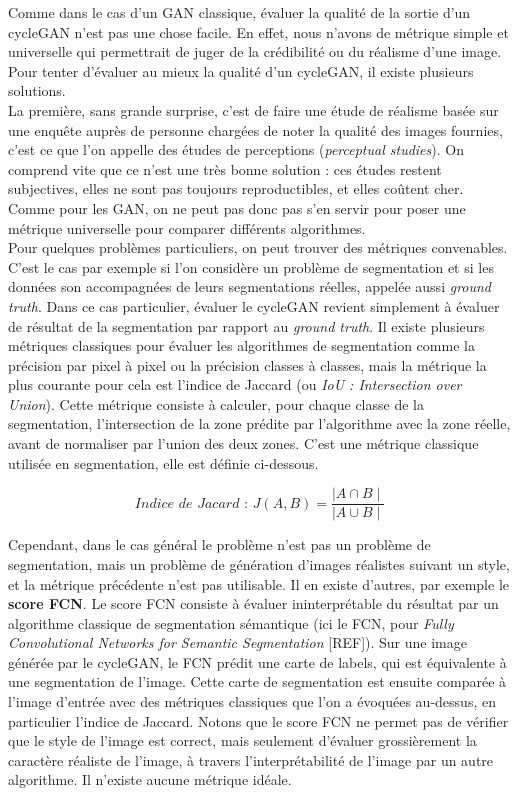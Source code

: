 Comme dans le cas d'un GAN classique, évaluer la qualité de la sortie d'un cycleGAN n'est pas une chose facile. En effet, nous n'avons de métrique simple et universelle qui permettrait de juger de la crédibilité ou du réalisme d'une image. Pour tenter d'évaluer au mieux la qualité d'un cycleGAN, il existe plusieurs solutions.\\

La première, sans grande surprise, c'est de faire une étude de réalisme basée sur une enquête auprès de personne chargées de noter la qualité des images fournies, c'est ce que l'on appelle des études de perceptions (\textit{perceptual studies}). On comprend vite que ce n'est une très bonne solution : ces études restent subjectives, elles ne sont pas toujours reproductibles, et elles coûtent cher. Comme pour les GAN, on ne peut pas donc pas s'en servir pour poser une métrique universelle pour comparer différents algorithmes.\\

Pour quelques problèmes particuliers, on peut trouver des métriques convenables. C'est le cas par exemple si l'on considère un problème de segmentation et si les données son accompagnées de leurs segmentations réelles, appelée aussi \textit{ground truth}. Dans ce cas particulier, évaluer le cycleGAN revient simplement à évaluer de résultat de la segmentation par rapport au \textit{ground truth}. Il existe plusieurs métriques classiques pour évaluer les algorithmes de segmentation comme la précision par pixel à pixel ou la précision classes à classes, mais la métrique la plus courante pour cela est l'indice de Jaccard (ou \textit{IoU : Intersection over Union}). Cette métrique consiste à calculer, pour chaque classe de la segmentation, l'intersection de la zone prédite par l'algorithme avec la zone réelle, avant de normaliser par l'union des deux zones. C'est une métrique classique utilisée en segmentation, elle est définie ci-dessous.

$$ \textit{Indice de Jacard : }J(A,B) = \frac{ \mid A \cap B \mid }{ \mid A \cup B \mid } $$

Cependant, dans le cas général le problème n'est pas un problème de segmentation, mais un problème de génération d'images réalistes suivant un style, et la métrique précédente n'est pas utilisable. Il en existe d'autres, par exemple le \textbf{score FCN}. Le score FCN consiste à évaluer ininterprétable du résultat par un algorithme classique de segmentation sémantique (ici le FCN, pour \textit{Fully Convolutional Networks for Semantic Segmentation} [REF]). Sur une image générée par le cycleGAN, le FCN prédit une carte de labels, qui est équivalente à une segmentation de l'image. Cette carte de segmentation est ensuite comparée à l’image d’entrée avec des métriques classiques que l'on a évoquées au-dessus, en particulier l'indice de Jaccard. Notons que le score FCN ne permet pas de vérifier que le style de l'image est correct, mais seulement d'évaluer grossièrement la caractère réaliste de l'image, à travers l'interprétabilité de l'image par un autre algorithme. Il n'existe aucune métrique idéale.


